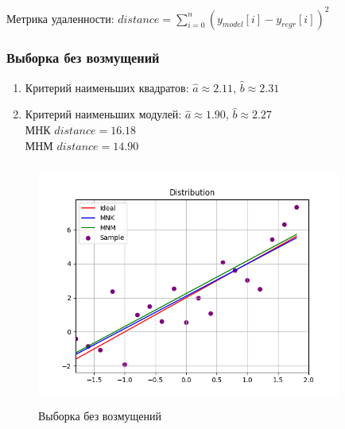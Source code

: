 \documentclass[a4paper,14pt]{article}
\begin{document}
	\noindent Метрика удаленности: $distance = \sum_{i=0}^{n}(y_{model}[i]-y_{regr}[i])^2$
	\subsubsection{Выборка без возмущений}
	\begin{enumerate}
		\item{Критерий наименьших квадратов:}
		$\hat{a}\approx 2.11$, $\hat{b}\approx 2.31$
		\item{Критерий наименьших модулей:}
		$\hat{a}\approx 1.90$, $\hat{b}\approx 2.27$\\
		МНК $distance = 16.18$\\
		МНМ $distance = 14.90$
	\end{enumerate}
	\begin{figure}[H]
		\centering
		\includegraphics[width = 10cm, height = 8cm]{../image/lab6_1.png}
		\caption{Выборка без возмущений}
		\label{w/o_pert}
	\end{figure}
	
\end{document}
